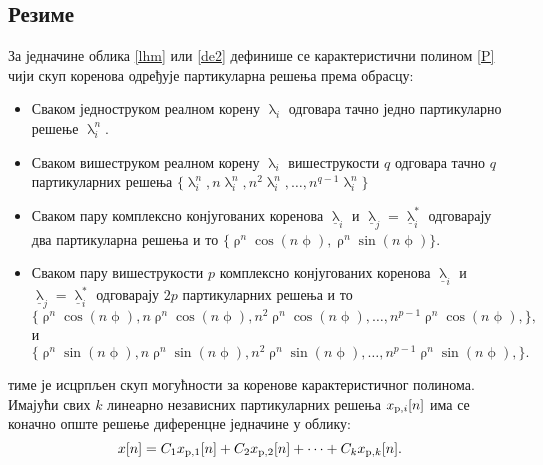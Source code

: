 \subsection{Резиме} 
За једначине облика \eqref{lhm} или 
\eqref{de2} дефинише се карактеристични полином 
\eqref{P} чији скуп коренова одређује партикуларна 
решења према обрасцу:
\begin{itemize}
\item Сваком једноструком реалном корену $\uplambda_i$ 
одговара тачно једно партикуларно решење $\uplambda_i^n$.
\item Сваком вишеструком реалном корену $\uplambda_i$ 
вишеструкости $q$ одговара тачно $q$ партикуларних 
решења $\{\uplambda_i^n, n\uplambda_i^n, 
n^2\uplambda_i^n, \ldots, n^{q-1}\uplambda_i^n\}$
\item Сваком пару комплексно конјугованих коренова 
$\underline\uplambda_i$ и $\underline\uplambda_j 
= \underline\uplambda_i^*$ одговарају два партикуларна
решења и то $\{\uprho^n \cos(n\upphi), 
\uprho^n \sin(n\upphi)\}$.
\item Сваком пару вишеструкости $p$ комплексно конјугованих коренова 
$\underline\uplambda_i$ и $\underline\uplambda_j 
= \underline\uplambda_i^*$ одговарају $2p$
партикуларних
решења и то 
$$\{\uprho^n \cos(n\upphi), 
n\uprho^n \cos(n\upphi), 
n^2\uprho^n \cos(n\upphi), 
\ldots,
n^{p-1}\uprho^n \cos(n\upphi), 
\},$$
и
$$\{\uprho^n \sin(n\upphi), 
n\uprho^n \sin(n\upphi), 
n^2\uprho^n \sin(n\upphi), \ldots,
n^{p-1}\uprho^n \sin(n\upphi), 
\}.$$
\end{itemize}
тиме је исцрпљен скуп могућности за коренове 
карактеристичног полинома. Имајући свих $k$ 
линеарно независних партикуларних решења 
$x_{{\rm p},i}[n]$
има се коначно опште решење диференцне једначине у 
облику:
\begin{equation}
x[n] = C_1 x_{{\rm p},1}[n] +
 C_2 x_{{\rm p},2}[n] + \cdots + C_k x_{{\rm p},k}[n].
\end{equation}

